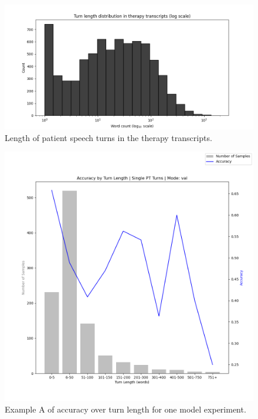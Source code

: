 \documentclass[12pt]{report}
\begin{document}
\begin{figure}
    \includegraphics[width=\textwidth]{figures/log_turn_length_dist_full.png}
    \caption{Length of patient speech turns in the therapy transcripts.}
    \label{fig: PACS turn length}
\end{figure}

\begin{figure}
    \includegraphics[width=\textwidth]{figures/accuracy_by_length_2024.03.13_11.54.44_model_7_val.png}
    \caption{Example A of accuracy over turn length for one model experiment.}
    \label{fig: acc over turn len 7}
\end{figure}
\end{document}
